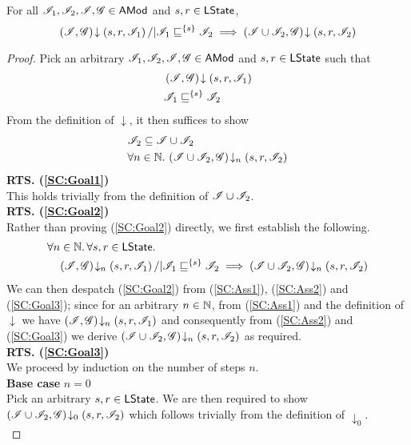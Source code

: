 %
%
%
\begin{lemma}\label{lem:shift-closure}
%
For all $\mathscr{I}_1, \mathscr{I}_2, \mathscr{I}, \mathscr{G} \in \textsf{AMod}$ and $s, r \in \textsf{LState}$,
%
\[
	\left(\mathscr{I}, \mathscr{G}\right) \!\downarrow \left(s, r, \mathscr{I}_1\right) /| \mathscr{I}_1 \sqsubseteq^{\{s\}} \mathscr{I}_2 \implies \left(\mathscr{I} \cup \mathscr{I}_2, \mathscr{G}\right) \!\downarrow \left(s, r, \mathscr{I}_2\right)
\]
%
\begin{proof} Pick an arbitrary $\mathscr{I}_1, \mathscr{I}_2, \mathscr{I}, \mathscr{G} \in \textsf{AMod}$ and $s, r \in \textsf{LState}$ such that 
%
\begin{align}
	& \left(\mathscr{I}, \mathscr{G}\right) \!\downarrow \left(s, r, \mathscr{I}_1\right) \label{SC:Ass1}\\
	& \mathscr{I}_1 \sqsubseteq^{\{s\}} \mathscr{I}_2 \label{SC:Ass2}
\end{align} 
%
From the definition of $\downarrow$, it then suffices to show
%
\begin{align}
	& \mathscr{I}_2 \subseteq \mathscr{I} \cup \mathscr{I}_2\label{SC:Goal1}\\
	& \forall n \in \mathbb{N}.\,  \left(\mathscr{I} \cup \mathscr{I}_2, \mathscr{G}\right) \!\downarrow_{n} \left(s, r, \mathscr{I}_2\right) \label{SC:Goal2}
\end{align}
%
\noindent\textbf{RTS. (\ref{SC:Goal1})} \\
This holds trivially from the definition of $\mathscr{I} \cup \mathscr{I}_2$.\\

\noindent\textbf{RTS. (\ref{SC:Goal2})} \\
Rather than proving (\ref{SC:Goal2}) directly, we first establish the following.
%
\begin{align}
	& \forall n \in \mathbb{N}.\, \forall s, r \in \textsf{LState}.\, \nonumber\\
	& \quad \left(\mathscr{I}, \mathscr{G}\right) \!\downarrow_{n} \left(s, r, \mathscr{I}_1\right) /| \mathscr{I}_1 \sqsubseteq^{\{s\}} \mathscr{I}_2 \implies \left(\mathscr{I} \cup \mathscr{I}_2, \mathscr{G}\right) \!\downarrow_{n} \left(s, r, \mathscr{I}_2\right) \label{SC:Goal3}
\end{align}
%
We can then despatch (\ref{SC:Goal2}) from (\ref{SC:Ass1}), (\ref{SC:Ass2}) and (\ref{SC:Goal3}); since for an arbitrary $n \in \mathbb{N}$, from (\ref{SC:Ass1}) and the definition of $\downarrow$ we have $\left(\mathscr{I}, \mathscr{G}\right) \!\downarrow_{n} \left(s, r, \mathscr{I}_1\right)$ and consequently from (\ref{SC:Ass2}) and (\ref{SC:Goal3}) we derive $\left(\mathscr{I} \cup \mathscr{I}_2, \mathscr{G}\right) \!\downarrow_{n} \left(s, r, \mathscr{I}_2\right) $ as required. \\

\noindent\textbf{RTS. (\ref{SC:Goal3})} \\
We proceed by induction on the number of steps $n$.\\

\noindent\textbf{Base case }$n=0$\\
Pick an arbitrary $s, r \in \textsf{LState}$. We are then required to show	$\left(\mathscr{I} \cup \mathscr{I}_2, \mathscr{G}\right) \!\downarrow_{0} \left(s, r, \mathscr{I}_2\right) $ which follows trivially from the definition of $\downarrow_0$.\\



\end{proof}
\end{lemma}
